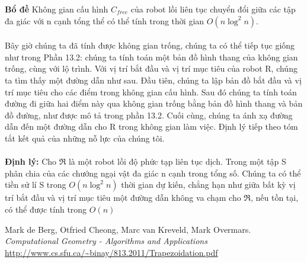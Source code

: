 \documentclass[a4paper,12pt]{report}
\begin{document}
\textbf{Bổ đề } Không gian cấu hình $C_{free}$ của robot lồi liên tục chuyển đổi giữa các tập đa giác với n cạnh tổng thể có thể tính trong thời gian $O(n\log^2n)$. \\ \\
Bây giờ chúng ta đã tính được không gian trống, chúng ta có thể tiếp tục giống như trong Phần 13.2: chúng ta tính toán một bản đồ hình thang của không gian trống, cùng với lộ trình. Với vị trí bắt đầu và vị trí mục tiêu của robot R, chúng ta tìm thấy một đường dẫn như sau. Đầu tiên, chúng ta lập bản đồ bắt đầu và vị trí mục tiêu cho các điểm trong không gian cấu hình. Sau đó chúng ta tính toán đường đi giữa hai điểm này qua không gian trống bằng bản đồ hình thang và bản đồ đường, như được mô tả trong phần 13.2. Cuối cùng, chúng ta ánh xạ đường dẫn đến một đường dẫn cho R trong không gian làm việc. Định lý tiếp theo tóm tắt kết quả của những nỗ lực của chúng tôi. \\ \\ 
\textbf{Định lý: } Cho $\Re$ là một robot lồi độ phức tạp liên tục dịch. Trong một tập S phân chia của các chướng ngại vật đa giác n cạnh trong tổng số. Chúng ta có thể tiền sử lí S trong $O (n\log^2n)$ thời gian dự kiến, chẳng hạn như giữa bất kỳ vị trí bắt đầu và vị trí mục tiêu một đường dẫn không va chạm cho $\Re$, nếu tồn tại, có thể được tính trong $O(n)$


\begin{thebibliography}{9} 
 Mark de Berg, Otfried Cheong, Marc van Kreveld, Mark Overmars. \textit{Computational Geometry - Algorithms and Applications}
 \url{http://www.cs.sfu.ca/~binay/813.2011/Trapezoidation.pdf}
\end{thebibliography}
\end{document}
